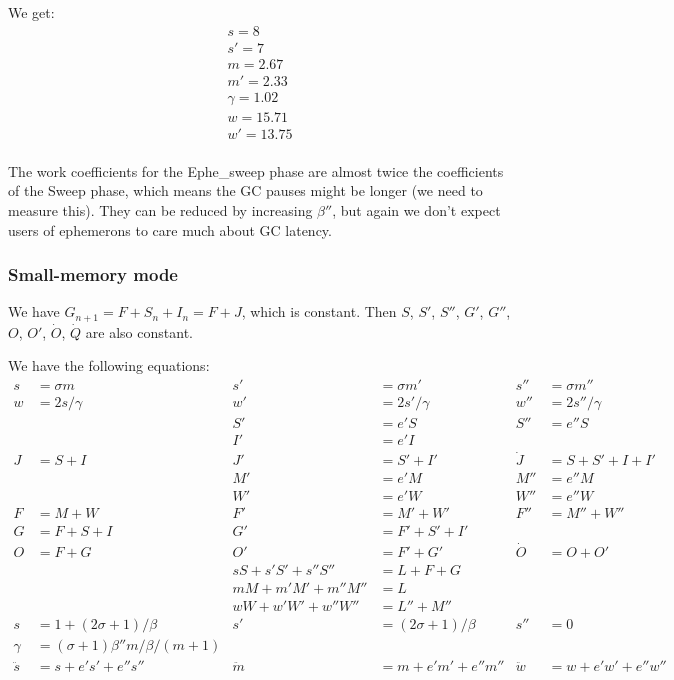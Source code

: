 \documentclass{article}
\begin{document}
We get:
\begin{gather}
s = 8 \\
s' = 7 \\
m = 2.67 \\
m' = 2.33 \\
\gamma = 1.02 \\
w = 15.71 \\
w' = 13.75 \\
\end{gather}

The work coefficients for the Ephe\_sweep phase are almost twice the
coefficients of the Sweep phase, which means the GC pauses might be
longer (we need to measure this). They can be reduced by increasing
$\beta''$, but again we don't expect users of ephemerons to care much
about GC latency.


\subsubsection{Small-memory mode}


We have $G_{n+1} = F + S_n + I_n = F + J$, which is constant. Then $S$,
$S'$, $S''$, $G'$, $G''$, $O$, $O'$, $\dot{O}$, $\dot{Q}$
are also constant.

\bigskip

We have the following equations:
\begin{align*}
 s &= \sigma m          &      s' &= \sigma m'   &  s'' &= \sigma m'' \\
 w &= 2s/\gamma         &      w' &= 2s'/\gamma  &  w'' &= 2s''/\gamma \\
   &                    &      S' &= e'S         &  S'' &= e''S \\
   &                    &      I' &= e'I \\
 J &= S + I             &      J' &= S' + I'  &  \dot{J} &= S + S' + I + I' \\
   &                    &      M' &= e'M         &  M'' &= e''M \\
   &                    &      W' &= e'W         &  W'' &= e''W \\
 F &= M + W             &      F' &= M' + W'     &  F'' &= M'' + W'' \\
 G &= F + S + I         &      G' &= F' + S' + I' \\
 O &= F + G             &      O' &= F' + G'     &  \dot{O} &= O + O' \\
   &     &     sS + s'S' + s''S'' &= L + F + G \\
   &     &     mM + m'M' + m''M'' &= L \\
   &     &     wW + w'W' + w''W'' &= L'' + M'' \\
 s &= 1 + (2\sigma +1)/\beta  &  s' &= (2\sigma+1)/\beta  &  s'' &= 0 \\
 \gamma &= (\sigma + 1)\beta'' m / \beta / (m+1)\\
 \ddot{s} &= s + e's' + e''s''  &  \ddot{m} &= m + e'm' + e''m'' &
    \ddot{w} &= w + e'w' + e''w'' \\
\end{align*}
\end{document}
